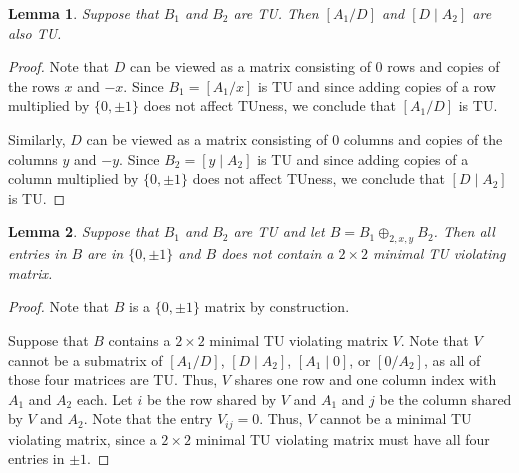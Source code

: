 \documentclass{article}
\newtheorem{lemma}{Lemma}
\theoremstyle{definition}
\begin{document}
\begin{lemma}\label{lem:two_sum_two_blocks_tu}
    Suppose that $B_{1}$ and $B_{2}$ are TU. Then $\left[A_{1} / D\right]$ and $\left[D \mid A_{2}\right]$ are also TU.
\end{lemma}

\begin{proof}
    Note that $D$ can be viewed as a matrix consisting of $0$ rows and copies of the rows $x$ and $-x$. Since $B_{1} = \left[A_{1} / x\right]$ is TU and since adding copies of a row multiplied by $\{0, \pm 1\}$ does not affect TUness, we conclude that $\left[A_{1} / D\right]$ is TU.

    Similarly, $D$ can be viewed as a matrix consisting of $0$ columns and copies of the columns $y$ and $-y$. Since $B_{2} = \left[y \mid A_{2}\right]$ is TU and since adding copies of a column multiplied by $\{0, \pm 1\}$ does not affect TUness, we conclude that $\left[D \mid A_{2}\right]$ is TU.
\end{proof}

\begin{lemma}\label{lem:two_sum_reg_mvm_12}
    Suppose that $B_{1}$ and $B_{2}$ are TU and let $B = B_{1} \oplus_{2, x, y} B_{2}$. Then all entries in $B$ are in $\{0, \pm 1\}$ and $B$ does not contain a $2 \times 2$ minimal TU violating matrix.
\end{lemma}

\begin{proof}
    Note that $B$ is a $\{0, \pm 1\}$ matrix by construction.

    Suppose that $B$ contains a $2 \times 2$ minimal TU violating matrix $V$. Note that $V$ cannot be a submatrix of $\left[A_{1} / D\right]$, $\left[D \mid A_{2}\right]$, $\left[A_{1} \mid 0\right]$, or $\left[0 / A_{2}\right]$, as all of those four matrices are TU. Thus, $V$ shares one row and one column index with $A_{1}$ and $A_{2}$ each. Let $i$ be the row shared by $V$ and $A_{1}$ and $j$ be the column shared by $V$ and $A_{2}$. Note that the entry $V_{ij} = 0$. Thus, $V$ cannot be a minimal TU violating matrix, since a $2 \times 2$ minimal TU violating matrix must have all four entries in $\pm 1$.
\end{proof}
\end{document}
